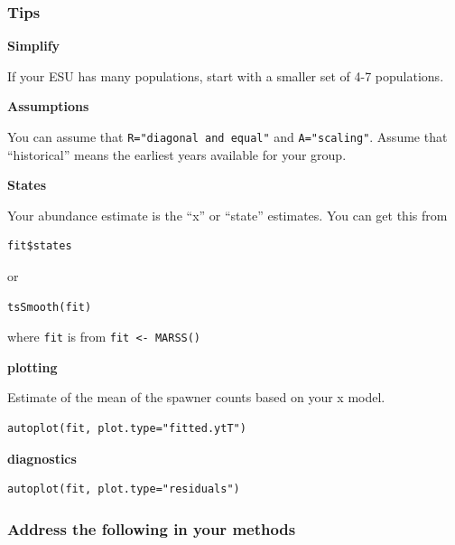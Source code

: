 \documentclass[
]{article}
\begin{document}
\hypertarget{tips}{%
\subsubsection{Tips}\label{tips}}

\textbf{Simplify}

If your ESU has many populations, start with a smaller set of 4-7
populations.

\textbf{Assumptions}

You can assume that \texttt{R="diagonal\ and\ equal"} and
\texttt{A="scaling"}. Assume that ``historical'' means the earliest
years available for your group.

\textbf{States}

Your abundance estimate is the ``x'' or ``state'' estimates. You can get
this from

\begin{verbatim}
fit$states
\end{verbatim}

or

\begin{verbatim}
tsSmooth(fit)
\end{verbatim}

where \texttt{fit} is from \texttt{fit\ \textless{}-\ MARSS()}

\textbf{plotting}

Estimate of the mean of the spawner counts based on your x model.

\begin{verbatim}
autoplot(fit, plot.type="fitted.ytT")
\end{verbatim}

\textbf{diagnostics}

\begin{verbatim}
autoplot(fit, plot.type="residuals")
\end{verbatim}

\hypertarget{address-the-following-in-your-methods}{%
\subsubsection{Address the following in your
methods}\label{address-the-following-in-your-methods}}
\end{document}
